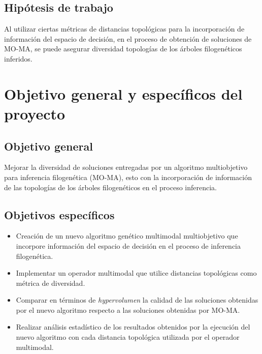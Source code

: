 \subsection{Hipótesis de trabajo}
\label{sec:hipotesis}
    
Al utilizar ciertas métricas de distancias topológicas para la incorporación de información del espacio de decisión, en el proceso de obtención de soluciones de MO-MA, se puede asegurar diversidad topologías de los árboles filogenéticos inferidos.

\section{Objetivo general y específicos del proyecto}
\label{cap:Proposal}

\subsection{Objetivo general}

Mejorar la diversidad de soluciones entregadas por un algoritmo multiobjetivo para inferencia filogenética (MO-MA), esto con la incorporación de información de las topologías de los árboles filogenéticos en el proceso inferencia.


\subsection{Objetivos específicos}

\begin{itemize}
    \item Creación de un nuevo algoritmo genético multimodal multiobjetivo que incorpore información del espacio de decisión en el proceso de inferencia filogenética.
    \item Implementar un operador multimodal que utilice distancias topológicas como métrica de diversidad.
    \item Comparar en términos de \textit{hypervolumen} la calidad de las soluciones obtenidas por el nuevo algoritmo respecto a las soluciones obtenidas por MO-MA.
    \item Realizar análisis estadístico de los resultados obtenidos por la ejecución del nuevo algoritmo con cada distancia topológica utilizada por el operador multimodal.
\end{itemize}